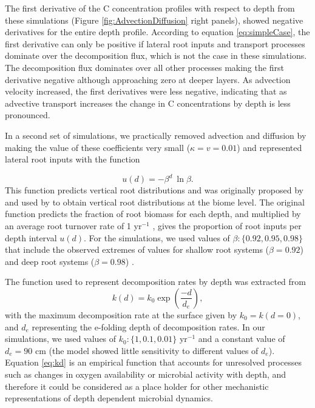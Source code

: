 \documentclass[11pt, oneside, a4paper]{article}   	%
\begin{document}
The first derivative of the C concentration profiles with respect to depth from these simulations (Figure \ref{fig:AdvectionDiffusion} right panels), showed negative derivatives for the entire depth profile. According to equation \ref{eq:simpleCase}, the first derivative can only be positive if lateral root inputs and transport processes dominate over the decomposition flux, which is not the case in these simulations. The decomposition flux dominates over all other processes making the first derivative negative although approaching zero at deeper layers. As advection velocity increased, the first derivatives were less negative, indicating that as advective transport increases the change in C concentrations by depth is less pronounced.

In a second set of simulations, we practically removed advection and diffusion by making the value of these coefficients very small ($\kappa = v =0.01$) and represented lateral root inputs with the function

\begin{equation} \label{eq:ud}
u(d) = - \beta^d \ \ln \beta .
\end{equation}
This function predicts vertical root distributions and was originally proposed by \citet{Gale1987} and used by \citet{Jackson1996, Jackson1997} to obtain vertical root distributions at the biome level. The original function predicts the fraction of root biomass for each depth, and multiplied by an average root turnover rate of 1 yr$^{-1}$ \citep{Gill2000}, gives the proportion of root inputs per depth interval $u(d)$. For the simulations, we used values of $\beta : \{0.92, 0.95, 0.98 \}$ that include the observed extremes of values for shallow root systems ($\beta =0.92$) and deep root systems ($\beta = 0.98$) \citep{Gale1987, Jackson1996}.

The function used to represent decomposition rates by depth was extracted from \citet{Koven2013BGS}
\begin{equation} \label{eq:kd}
k(d) = k_0 \exp \left(\frac{-d}{d_e} \right),
\end{equation}
with the maximum decomposition rate at the surface given by $k_0 = k(d=0)$, and $d_e$ representing the e-folding depth of decomposition rates. In our simulations, we used values of $k_0 : \{1, 0.1, 0.01 \}$ yr$^{-1}$ and a constant value of $d_e = 90$ cm (the model showed little sensitivity to different values of $d_e$). Equation \ref{eq:kd} is an empirical function that accounts for unresolved processes such as changes in oxygen availability or microbial activity with depth, and therefore it could be considered as a place holder for other mechanistic representations of depth dependent microbial dynamics. 
\end{document}
